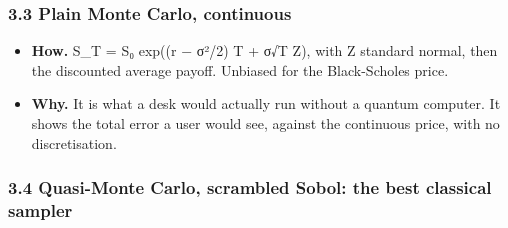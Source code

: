 \documentclass[
  10pt,
]{article}
\providecommand{\tightlist}{%
  \setlength{\itemsep}{0pt}\setlength{\parskip}{0pt}}
\begin{document}
\hypertarget{33-plain-monte-carlo-continuous}{%
\subsubsection{3.3 Plain Monte Carlo,
continuous}\label{33-plain-monte-carlo-continuous}}

\begin{itemize}
\tightlist
\item
  \textbf{How.} S\_T = S₀ exp((r − σ²/2) T + σ√T Z), with Z standard
  normal, then the discounted average payoff. Unbiased for the
  Black-Scholes price.
\item
  \textbf{Why.} It is what a desk would actually run without a quantum
  computer. It shows the total error a user would see, against the
  continuous price, with no discretisation.
\end{itemize}

\hypertarget{34-quasi-monte-carlo-scrambled-sobol-the-best-classical-sampler}{%
\subsubsection{3.4 Quasi-Monte Carlo, scrambled Sobol: the best
classical
sampler}\label{34-quasi-monte-carlo-scrambled-sobol-the-best-classical-sampler}}
\end{document}
